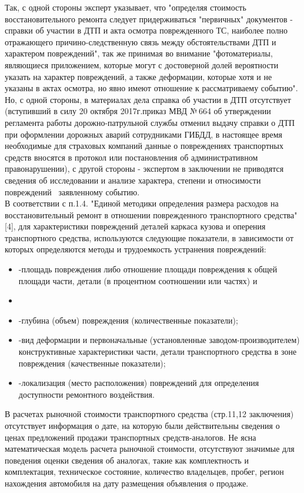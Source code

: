 Так,  с одной стороны эксперт указывает, что "определяя стоимость восстановительного ремонта следует придерживаться "первичных" документов - справки об участии в ДТП и акта осмотра поврежденного ТС, наиболее полно отражающего причино-следственную связь   между обстоятельствами ДТП и характером повреждений", так же принимая во внимание "фотоматериалы, являющиеся приложением, которые могут с достоверной долей вероятности указать на характер повреждений, а также деформации, которые хотя и не указаны в актах осмотра, но явно имеют отношение к рассматриваему событию".   Но, с одной стороны, в материалах дела справка об участии в ДТП отсутствует (вступивший в силу 20 октября 2017г.приказ МВД № 664 об утверждении регламента работы дорожно-патрульной службы отменил выдачу справки о ДТП при оформлении дорожных аварий сотрудниками ГИБДД, в настоящее время необходимые для страховых компаний данные о повреждениях транспортных средств вносятся в протокол или постановления об административном правонарушении), с другой стороны - экспертом в заключении не приводятся сведения об исследовании и анализе  характера, степени и относимости повреждений  \, заявленному событию. \\
В соответствии с п.1.4. "Единой методики определения размера расходов на восстановительный ремонт в отношении поврежденного транспортного средства"[4],  для характеристики повреждений деталей каркаса кузова и оперения транспортного средства, используются следующие показатели, в зависимости от которых определяются методы и трудоемкость устранения повреждений:
	
	\begin{itemize}
	
	\item -площадь повреждения либо отношение площади повреждения к общей площади части, детали (в процентном соотношении или частях) и \item \item -глубина (объем) повреждения (количественные показатели);
	\item -вид деформации и первоначальные (установленные заводом-производителем) конструктивные характеристики части, детали транспортного средства в зоне повреждения (качественные показатели);
	\item -локализация (место расположения) повреждений для определения доступности ремонтного воздействия.
	
	\end{itemize}

 
В расчетах рыночной стоимости транспортного средства (стр.11,12 заключения) отсутствует  информация о дате, на которую были  действительны сведения о ценах предложений продажи транспортных средств-аналогов. Не ясна математическая модель расчета рыночной стоимости, отсутствуют значимые для поведения оценки сведения об аналогах, такие как комплектность и комплектация, техническое состояние, количество владельцев, пробег, регион нахождения автомобиля на дату размещения объявления о продаже.

